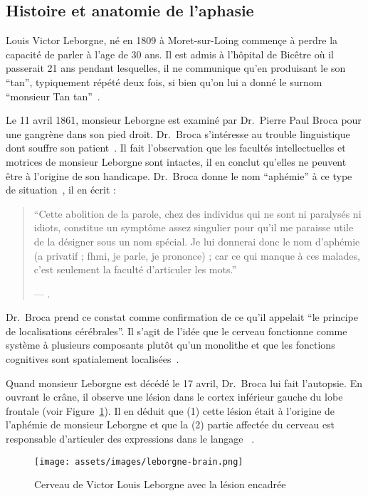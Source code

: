 \subsection{Histoire et anatomie de l'aphasie}

Louis Victor Leborgne, né en 1809 à Moret-sur-Loing commençe à perdre 
la capacité de parler à l'age de 30 ans.
Il est admis à l'hôpital de Bicêtre où il passerait 21 ans pendant lesquelles, 
il ne communique qu'en produisant le son ``tan'', typiquement répété deux fois, 
si bien qu'on lui a donné le surnom ``monsieur Tan tan''~\cite{Mohammed_Narayan_Patra_Nanda_2018}.

Le 11 avril 1861, monsieur Leborgne est examiné par Dr.~Pierre Paul Broca 
pour une gangrène dans son pied droit.
Dr.~Broca s'intéresse au trouble linguistique dont souffre son patient~\cite{Lorch_2011}.
Il fait l'observation que les facultés intellectuelles et motrices de monsieur Leborgne sont intactes,
il en conclut qu'elles ne peuvent être à l'origine de son handicape. 
Dr.~Broca donne le nom ``aphémie'' à ce type de situation~\cite{Broca}, il en écrit :

\begin{quotation}
    ``Cette abolition de la parole, chez des individus qui ne sont ni paralysés ni idiots, constitue un symptôme assez singulier pour qu'il me paraisse utile de la désigner sous un nom spécial. Je lui donnerai donc le nom d'aphémie (\textgreek{a} privatif ; \textgreek{fhmi}, je parle, je prononce) ; car ce qui manque à ces malades, c'est seulement la faculté d'articuler les mots.''
    \begin{flushright}
        \rm --- .
    \end{flushright}
\end{quotation}

Dr.~Broca prend ce constat comme confirmation de ce qu'il appelait 
``le principe de localisations cérébrales''.
Il s'agit de l'idée que le cerveau fonctionne comme système à plusieurs composants plutôt qu'un monolithe
et que les fonctions cognitives sont spatialement localisées~\cite{Fodor_1983}.

Quand monsieur Leborgne est décédé le 17 avril, Dr.~Broca lui fait l'autopsie.
En ouvrant le crâne, il observe une lésion dans le cortex inférieur gauche du lobe frontale 
(voir Figure~\ref{fig.leborgne-brain}).
Il en déduit que (1) cette lésion était à l'origine de l'aphémie de monsieur Leborgne et 
que la (2) partie affectée du cerveau est responsable d'articuler des expressions dans le langage
~\cite{Broca,Lorch_2011,Mohammed_Narayan_Patra_Nanda_2018}.

\begin{figure}[htb]
    \begin{center}
        \texttt{[image: assets/images/leborgne-brain.png]}
    \end{center}
    \caption{Cerveau de Victor Louis Leborgne avec la lésion encadrée}
    \label{fig.leborgne-brain}
\end{figure}